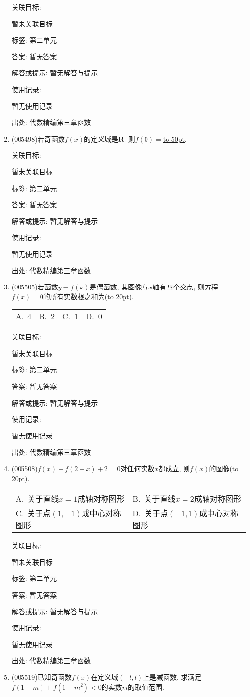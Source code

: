 \documentclass[10pt,a4paper]{article}
\newcommand{\blank}[1]{\underline{\hbox to #1pt{}}}
\newcommand{\bracket}[1]{(\hbox to #1pt{})}
\newcommand{\twoch}[4]{\par\begin{tabular}{p{.46\textwidth}p{.46\textwidth}}
A.~#1& B.~#2\\
C.~#3& D.~#4
\end{tabular}}
\newcommand{\fourch}[4]{\par\begin{tabular}{p{.23\textwidth}p{.23\textwidth}p{.23\textwidth}p{.23\textwidth}}
A.~#1 &B.~#2& C.~#3& D.~#4
\end{tabular}}
\begin{document}
\begin{enumerate}[1.]
关联目标:

暂未关联目标



标签: 第二单元

答案: 暂无答案

解答或提示: 暂无解答与提示

使用记录:

暂无使用记录


出处: 代数精编第三章函数
\item { (005498)}若奇函数$f(x)$的定义域是$\mathbf{R}$, 则$f(0)=$\blank{50}.


关联目标:

暂未关联目标



标签: 第二单元

答案: 暂无答案

解答或提示: 暂无解答与提示

使用记录:

暂无使用记录


出处: 代数精编第三章函数
\item { (005505)}若函数$y=f(x)$是偶函数, 其图像与$x$轴有四个交点, 则方程$f(x)=0$的所有实数根之和为\bracket{20}.
\fourch{$4$}{$2$}{$1$}{$0$}


关联目标:

暂未关联目标



标签: 第二单元

答案: 暂无答案

解答或提示: 暂无解答与提示

使用记录:

暂无使用记录


出处: 代数精编第三章函数
\item { (005508)}$f(x)+f(2-x)+2=0$对任何实数$x$都成立, 则$f(x)$的图像\bracket{20}.
\twoch{关于直线$x=1$成轴对称图形}{关于直线$x=2$成轴对称图形}{关于点$(1, -1)$成中心对称图形}{关于点$(-1,1)$成中心对称图形}


关联目标:

暂未关联目标



标签: 第二单元

答案: 暂无答案

解答或提示: 暂无解答与提示

使用记录:

暂无使用记录


出处: 代数精编第三章函数
\item { (005519)}已知奇函数$f(x)$在定义域$(-l, l)$上是减函数, 求满足$f(1-m)+f(1-m^2)<0$的实数$m$的取值范围.



\end{enumerate}
\end{document}
